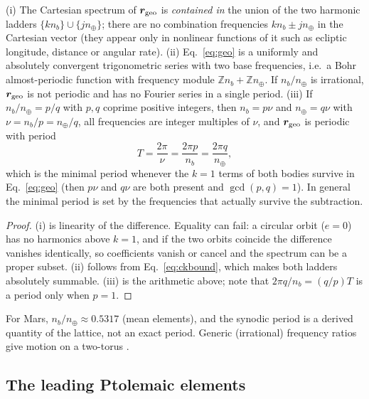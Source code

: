 \begin{proposition}
\label{prop:geo}
(i) The Cartesian spectrum of $\bm{r}_{\mathrm{geo}}$ is \emph{contained in} the union of the
two harmonic ladders $\{kn_b\}\cup\{jn_\oplus\}$; there are no combination frequencies
$kn_b\pm jn_\oplus$ in the Cartesian vector (they appear only in nonlinear
functions of it such as ecliptic longitude, distance or angular rate).
(ii) Eq.~\eqref{eq:geo} is a uniformly and absolutely convergent trigonometric
series with two base frequencies, i.e.\ a Bohr almost-periodic function
\cite{Bohr1925} with frequency module $\mathbb Zn_b+\mathbb Zn_\oplus$. If
$n_b/n_\oplus$ is irrational, $\bm{r}_{\mathrm{geo}}$ is not periodic and has no Fourier series
in a single period.
(iii) If $n_b/n_\oplus=p/q$ with $p,q$ coprime positive integers, then
$n_b=p\nu$ and $n_\oplus=q\nu$ with $\nu=n_b/p=n_\oplus/q$, all frequencies
are integer multiples of $\nu$, and $\bm{r}_{\mathrm{geo}}$ is periodic with period
\begin{equation}
T=\frac{2\pi}{\nu}=\frac{2\pi p}{n_b}=\frac{2\pi q}{n_\oplus},
\label{eq:period}
\end{equation}
which is the minimal period whenever the $k=1$ terms of both bodies survive in
Eq.~\eqref{eq:geo} (then $p\nu$ and $q\nu$ are both present and $\gcd(p,q)=1$).
In general the minimal period is set by the frequencies that actually survive
the subtraction.
\end{proposition}
\begin{proof}
(i) is linearity of the difference. Equality can fail: a circular orbit ($e=0$)
has no harmonics above $k=1$, and if the two orbits coincide the difference
vanishes identically, so coefficients vanish or cancel and the spectrum can be a
proper subset. (ii) follows from Eq.~\eqref{eq:ckbound},
which makes both ladders absolutely summable. (iii) is the arithmetic
above; note that $2\pi q/n_b=(q/p)T$ is a period only when $p=1$.
\end{proof}

For Mars, $n_b/n_\oplus\approx0.5317$ (mean elements), and the synodic period
is a derived quantity of the lattice, not an exact period. Generic
(irrational) frequency ratios give motion on a two-torus
\cite{Gallavotti2001}.

\subsection{The leading Ptolemaic elements}
\label{sec:th-ptolemy}


